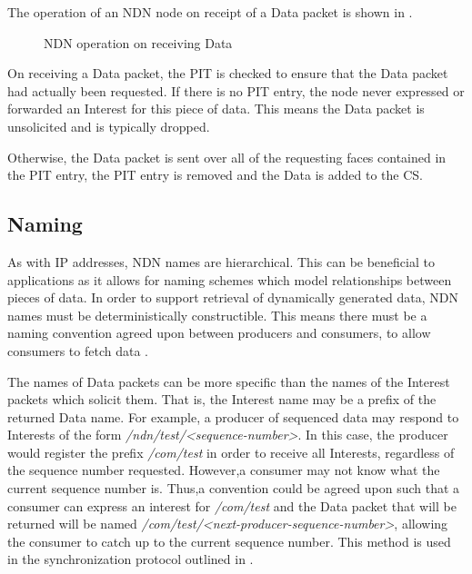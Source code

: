 The operation of an NDN node on receipt of a Data packet is shown in .
\begin{figure}[H]
    \centering
    \caption{NDN operation on receiving Data}
    \label{fig:ndn-on-data}
\end{figure}


On receiving a Data packet, the PIT is checked to ensure that the Data packet had actually been requested. If there is no PIT entry, the node never expressed or forwarded an Interest for this piece of data. This means the Data packet is unsolicited and is typically dropped.

Otherwise, the Data packet is sent over all of the requesting faces contained in the PIT entry, the PIT entry is removed and the Data is added to the CS.











\subsection{Naming}\label{sec:ndn-names}
As with IP addresses, NDN names are hierarchical. This can be beneficial to applications as it allows for naming schemes which model relationships between pieces of data. In order to support retrieval of dynamically generated data, NDN names must be deterministically constructible. This means there must be a naming convention agreed upon between producers and consumers, to allow consumers to fetch data \cite{ndn-project}. 

The names of Data packets can be more specific than the names of the Interest packets which solicit them. That is, the Interest name may be a prefix of the returned Data name. For example, a producer of sequenced data may respond to Interests of the form \textit{/ndn/test/<sequence-number>}.  In this case, the producer would register the prefix \textit{/com/test} in order to receive all Interests, regardless of the sequence number requested. However,a consumer may not know what the current sequence number is. Thus,a convention could be agreed upon such that a consumer can express an interest for \textit{/com/test} and the Data packet that will be returned will be named \textit{/com/test/<next-producer-sequence-number>}, allowing the consumer to catch up to the current sequence number. This method is used in the synchronization protocol outlined in .














